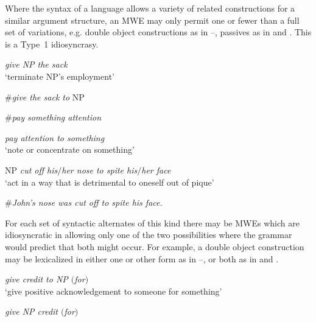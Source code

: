 \documentclass[output=paper]{langsci/langscibook}
\begin{document}
Where the syntax of a language allows a variety of related constructions for a similar argument structure, an MWE may only permit one or fewer than a full set of variations, e.g. double object constructions as in --, passives  as in  and . This is a Type~1 idiosyncrasy.

\begin{exe}
\ex\label{ex:ex38} \textit{give \textnormal{NP} the sack}\\
‘terminate NP’s employment’

\ex\label{ex:ex39} \#\textit{give the sack to} NP

\ex\label{ex:ex40} \#\textit{pay something attention}

\ex\label{ex:ex41} \textit{pay attention to something}\\
‘note or concentrate on something’

\ex\label{ex:ex42} NP \textit{cut off his$/$her nose to spite his$/$her face}\\
‘act in a way that is detrimental to oneself out of pique’

\ex\label{ex:ex43} \#\textit{John’s nose was cut off to spite his face.}
\end{exe}

For each set of syntactic alternates of this kind there may be MWEs which are idiosyncratic in allowing only one of the two possibilities where the grammar would predict that both might occur. For example, a double object construction may be lexicalized in either one or other form as in --, or both as in  and .

\begin{exe}
\ex\label{ex:ex44} \textit{give credit to \textnormal{NP} $($for$)$}\\
‘give positive acknowledgement to someone for something’

\ex\label{ex:ex45} \textit{give \textnormal{NP} credit $($for$)$}
\end{exe}
\end{document}
